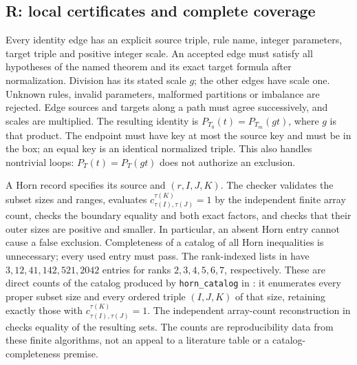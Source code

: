 \documentclass[11pt]{article}
\begin{document}
\subsection{R: local certificates and complete coverage}
Every identity edge has an explicit source triple, rule name, integer
parameters, target triple and positive integer scale. An accepted edge
must satisfy all hypotheses of the named theorem and its exact target
formula after normalization. Division has its stated scale $g$; the
other edges have scale one. Unknown rules, invalid parameters, malformed
partitions or imbalance are rejected. Edge sources and targets along a
path must agree successively, and scales are multiplied. The resulting
identity is $P_{T_0}(t)=P_{T_m}(gt)$, where $g$ is that product.
The endpoint must have key at most the source key and must be in the
box; an equal key is an identical normalized triple. This also handles
nontrivial loops: $P_T(t)=P_T(gt)$ does not authorize an exclusion.

A Horn record specifies its source and $(r,I,J,K)$. The checker validates
the subset sizes and ranges, evaluates
$c^{\tau(K)}_{\tau(I),\tau(J)}=1$ by the independent finite array count,
checks the boundary equality and both exact factors, and checks that
their outer sizes are positive and smaller. In particular, an absent
Horn entry cannot cause a false exclusion. Completeness of a catalog
of all Horn inequalities is unnecessary; every used entry must pass.
The rank-indexed lists in  have
$3,12,41,142,521,2042$ entries for ranks $2,3,4,5,6,7$, respectively.
These are direct counts of the catalog produced by \texttt{horn\_catalog}
in : it enumerates every proper subset
size and every ordered triple $(I,J,K)$ of that size, retaining exactly
those with $c^{\tau(K)}_{\tau(I),\tau(J)}=1$.
The independent array-count reconstruction in
 checks equality of the resulting sets.
The counts are reproducibility data from these finite algorithms,
not an appeal to a literature table or a catalog-completeness premise.
\end{document}
